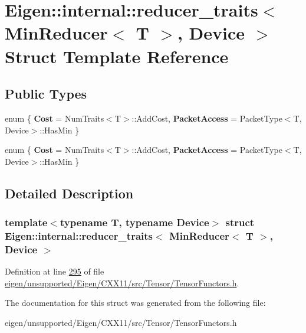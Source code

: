 \hypertarget{struct_eigen_1_1internal_1_1reducer__traits_3_01_min_reducer_3_01_t_01_4_00_01_device_01_4}{}\section{Eigen\+:\+:internal\+:\+:reducer\+\_\+traits$<$ Min\+Reducer$<$ T $>$, Device $>$ Struct Template Reference}
\label{struct_eigen_1_1internal_1_1reducer__traits_3_01_min_reducer_3_01_t_01_4_00_01_device_01_4}
\subsection*{Public Types}
\begin{DoxyCompactItemize}
\item 
\mbox{\label{struct_eigen_1_1internal_1_1reducer__traits_3_01_min_reducer_3_01_t_01_4_00_01_device_01_4_a8a146b6a44c497d7979b38f277b740d9}} 
enum \{ {\bfseries Cost} = Num\+Traits$<$T$>$\+:\+:Add\+Cost, 
{\bfseries Packet\+Access} = Packet\+Type$<$T, Device$>$\+:\+:Has\+Min
 \}
\item 
\mbox{\label{struct_eigen_1_1internal_1_1reducer__traits_3_01_min_reducer_3_01_t_01_4_00_01_device_01_4_a6fd5eb2f3553f7f904591cd1f0adfd13}} 
enum \{ {\bfseries Cost} = Num\+Traits$<$T$>$\+:\+:Add\+Cost, 
{\bfseries Packet\+Access} = Packet\+Type$<$T, Device$>$\+:\+:Has\+Min
 \}
\end{DoxyCompactItemize}


\subsection{Detailed Description}
\subsubsection*{template$<$typename T, typename Device$>$\newline
struct Eigen\+::internal\+::reducer\+\_\+traits$<$ Min\+Reducer$<$ T $>$, Device $>$}



Definition at line \hyperlink{eigen_2unsupported_2_eigen_2_c_x_x11_2src_2_tensor_2_tensor_functors_8h_source_l00295}{295} of file \hyperlink{eigen_2unsupported_2_eigen_2_c_x_x11_2src_2_tensor_2_tensor_functors_8h_source}{eigen/unsupported/\+Eigen/\+C\+X\+X11/src/\+Tensor/\+Tensor\+Functors.\+h}.



The documentation for this struct was generated from the following file\+:\begin{DoxyCompactItemize}
\item 
eigen/unsupported/\+Eigen/\+C\+X\+X11/src/\+Tensor/\+Tensor\+Functors.\+h\end{DoxyCompactItemize}
